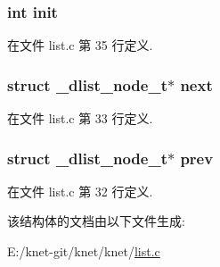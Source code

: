 \subsubsection[{init}]{\setlength{\rightskip}{0pt plus 5cm}int init}\label{struct__dlist__node__t_a795ea50921b36311ffd5e7baa2ef1f7e}


在文件 list.\+c 第 35 行定义.

\hypertarget{struct__dlist__node__t_a9fdf6e7d59374094c75a6682a6fe4ad0}{}
\subsubsection[{next}]{\setlength{\rightskip}{0pt plus 5cm}struct {\bf \+\_\+dlist\+\_\+node\+\_\+t}$\ast$ next}\label{struct__dlist__node__t_a9fdf6e7d59374094c75a6682a6fe4ad0}


在文件 list.\+c 第 33 行定义.

\hypertarget{struct__dlist__node__t_a398cfb3580651f0433e3b56a07d8a11c}{}
\subsubsection[{prev}]{\setlength{\rightskip}{0pt plus 5cm}struct {\bf \+\_\+dlist\+\_\+node\+\_\+t}$\ast$ prev}\label{struct__dlist__node__t_a398cfb3580651f0433e3b56a07d8a11c}


在文件 list.\+c 第 32 行定义.



该结构体的文档由以下文件生成\+:\begin{DoxyCompactItemize}
\item 
E\+:/knet-\/git/knet/knet/\hyperlink{list_8c}{list.\+c}\end{DoxyCompactItemize}
